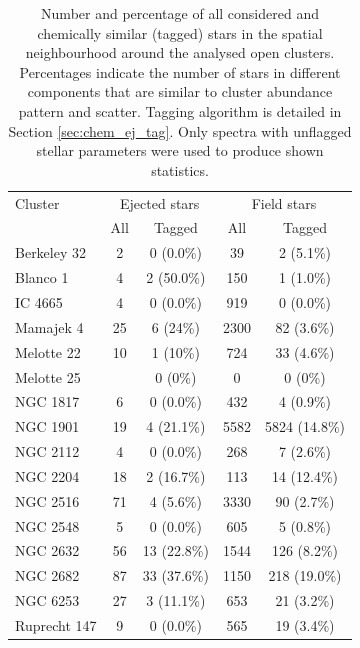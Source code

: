 \begin{table}
	\centering
	\caption{Number and percentage of all considered and chemically similar (tagged) stars in the spatial neighbourhood around the analysed open clusters. Percentages indicate the number of stars in different components that are similar to cluster abundance pattern and scatter. Tagging algorithm is detailed in Section \ref{sec:chem_ej_tag}. Only spectra with unflagged stellar parameters were used to produce shown statistics.}
	\begin{tabular}{l | c | c | c | c }
		\hline
		Cluster & \multicolumn{2}{c}{Ejected stars}  & \multicolumn{2}{c}{Field stars} \\
		 & All & Tagged & All & Tagged \\
		\hline
		Berkeley 32  & 2 & 0 (0.0\%) & 39 & 2 (5.1\%) \\ 
		Blanco 1     & 4 & 2 (50.0\%) & 150 & 1 (1.0\%) \\
		IC 4665      & 4 & 0 (0.0\%) & 919 & 0 (0.0\%) \\
		Mamajek 4    & 25 & 6 (24\%) & 2300 & 82 (3.6\%) \\
		Melotte 22   & 10 & 1 (10\%) & 724 & 33 (4.6\%) \\
		Melotte 25   & \rb{TBD} & 0 (0\%) & 0 & 0 (0\%) \\
		NGC 1817     & 6 & 0 (0.0\%) & 432 & 4 (0.9\%) \\
		NGC 1901     & 19 & 4 (21.1\%) & 5582 & 5824 (14.8\%) \\
		NGC 2112     & 4 & 0 (0.0\%) & 268 & 7 (2.6\%) \\
		NGC 2204     & 18 & 2 (16.7\%) & 113 & 14 (12.4\%) \\
		NGC 2516     & 71 & 4 (5.6\%) & 3330 & 90 (2.7\%) \\
		NGC 2548     & 5 & 0 (0.0\%) & 605 & 5 (0.8\%) \\
		NGC 2632     & 56 & 13 (22.8\%) & 1544 & 126 (8.2\%) \\
		NGC 2682     & 87 & 33 (37.6\%) & 1150 & 218 (19.0\%) \\
		NGC 6253     & 27 & 3 (11.1\%) & 653 & 21 (3.2\%) \\
		Ruprecht 147 & 9 & 0 (0.0\%) & 565 & 19 (3.4\%) \\
		\hline
	\end{tabular}
	\label{tab:cluster_stats_abundtag}
\end{table}

